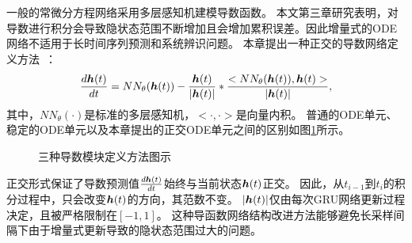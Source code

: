 一般的常微分方程网络采用多层感知机建模导数函数。
本文第三章研究表明，对导数进行积分会导致隐状态范围不断增加且会增加累积误差。因此增量式的ODE网络不适用于长时间序列预测和系统辨识问题。
本章提出一种正交的导数网络定义方法~\cite{jia2019neural}：
\begin{equation}
\frac{d \boldsymbol h(t)}{dt}=NN_{\theta}(\boldsymbol h(t))-\frac{\boldsymbol h(t)}{|\boldsymbol h(t)|}*\frac{<{NN_{\theta}(\boldsymbol h(t))},{\boldsymbol h(t)}>}{|\boldsymbol h(t)|},
\end{equation}
其中，$NN_{\theta}(\cdot)$是标准的多层感知机，$<\cdot, \cdot>$是向量内积。 
普通的ODE单元、稳定的ODE单元以及本章提出的正交ODE单元之间的区别如图\ref{fig:cells}所示。
\begin{figure}[h]
    \centering
    \caption{三种导数模块定义方法图示}
    \label{fig:cells}
\end{figure}
正交形式保证了导数预测值$\frac{d \boldsymbol h(t)}{dt}$始终与当前状态$\boldsymbol h(t)$正交。
因此，从$t_{i-1}$到$t_{i}$的积分过程中，只会改变$\boldsymbol h(t)$的方向，其范数不变。
$|\boldsymbol h(t)|$仅由每次GRU网络更新过程决定，且被严格限制在$[-1,1]$。
这种导函数网络结构改进方法能够避免长采样间隔下由于增量式更新导致的隐状态范围过大的问题。

